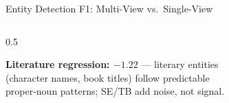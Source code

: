 \documentclass[aspectratio=169,10pt]{beamer}
\newcommand{\hr}[1]{\textcolor{dkred}{\textbf{#1}}}
\begin{document}
\begin{frame}{Entity Detection F1: Multi-View vs.\ Single-View}
\begin{columns}[T]
\begin{column}{0.5\textwidth}
      \vspace{0.2em}
      \footnotesize
      \hr{Literature regression: $-1.22$} — literary entities\\
      (character names, book titles) follow predictable\\
      proper-noun patterns; SE/TB add noise, not signal.
    \end{column}
  \end{columns}
\end{frame}

\end{document}
